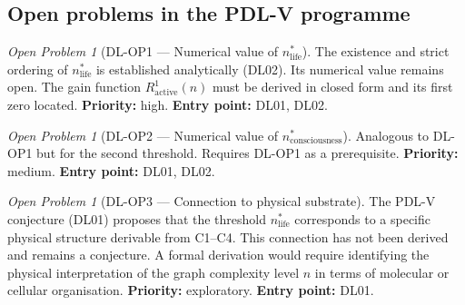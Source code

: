 \documentclass[11pt,a4paper]{article}
\theoremstyle{plain}
\theoremstyle{definition}
\theoremstyle{remark}
\newtheorem{openproblem}[theorem]{Open Problem}
\begin{document}
\subsection{Open problems in the PDL-V programme}

\begin{openproblem}[DL-OP1 --- Numerical value of $n^*_{\mathrm{life}}$]
\label{op:DL_nlife}
The existence and strict ordering of $n^*_{\mathrm{life}}$ is established analytically (DL02). Its numerical value remains open. The gain function $R^1_{\mathrm{active}}(n)$ must be derived in closed form and its first zero located. \textbf{Priority:} high. \textbf{Entry point:} DL01, DL02.
\end{openproblem}

\begin{openproblem}[DL-OP2 --- Numerical value of $n^*_{\mathrm{consciousness}}$]
\label{op:DL_nconsciousness}
Analogous to DL-OP1 but for the second threshold. Requires DL-OP1 as a prerequisite. \textbf{Priority:} medium. \textbf{Entry point:} DL01, DL02.
\end{openproblem}

\begin{openproblem}[DL-OP3 --- Connection to physical substrate]
\label{op:DL_substrate}
The PDL-V conjecture (DL01) proposes that the threshold $n^*_{\mathrm{life}}$ corresponds to a specific physical structure derivable from C1--C4. This connection has not been derived and remains a conjecture. A formal derivation would require identifying the physical interpretation of the graph complexity level $n$ in terms of molecular or cellular organisation. \textbf{Priority:} exploratory. \textbf{Entry point:} DL01.
\end{openproblem}

\clearpage



\end{document}
